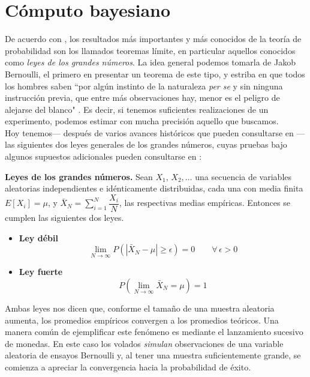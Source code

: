 \chapter{Cómputo bayesiano}

De acuerdo con \textcite{Ross10}, los resultados más importantes y más conocidos de la teoría de probabilidad son los llamados teoremas límite, en particular aquellos conocidos como \textit{leyes de los grandes números}. La idea general podemos tomarla de Jakob Bernoulli, el primero en presentar un teorema de este tipo, y estriba en que todos los hombres saben ``por algún instinto de la naturaleza \textit{per se} y sin ninguna instrucción previa, que entre más observaciones hay, menor es el peligro de alejarse del blanco" \parencite{Pulskamp09}. Es decir, si tenemos suficientes realizaciones de un experimento, podemos estimar con mucha precisión aquello que buscamos.\\

Hoy tenemos--- después de varios avances históricos que pueden consultarse en \textcite{Seneta13}--- las siguientes dos leyes generales de los grandes números, cuyas pruebas bajo algunos supuestos adicionales pueden consultarse en \textcite{Ross10}:

\begin{teo} \label{teo:LGN}
\textbf{Leyes de los grandes números.}
Sean $X_1,\,X_2,\dots$ una secuencia de variables aleatorias independientes e idénticamente distribuidas, cada una con media finita $E[X_i]=\mu$, y $\bar{X}_N=\sum\limits_{i=1}^N\dfrac{X_i}{N}$, las respectivas medias empíricas. Entonces se cumplen las siguientes dos leyes.
\begin{itemize}
\item \textbf{Ley débil}
\begin{equation*}
\lim_{N \to \infty} P\left( |\bar{X}_N-\mu| \geq \epsilon \right)  = 0 \qquad \forall \, \epsilon > 0
\end{equation*}
\item \textbf{Ley fuerte}
\begin{equation*}
P\left(\lim_{N \to \infty} \bar{X}_N = \mu \right)  = 1 
\end{equation*}
\end{itemize}
\end{teo}

Ambas leyes nos dicen que, conforme el tamaño de una muestra aleatoria aumenta, los promedios empíricos convergen a los promedios teóricos. Una manera común de ejemplificar este fenómeno es mediante el lanzamiento sucesivo de monedas. En este caso los volados \textit{simulan} observaciones de una variable aleatoria de ensayos Bernoulli y, al tener una muestra suficientemente grande, se comienza a apreciar la convergencia hacia la probabilidad de éxito.\\ 


